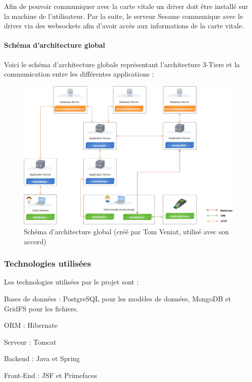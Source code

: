 Afin de pouvoir communiquer avec la carte vitale un driver doit être installé sur la machine de l'utilisateur. Par la suite, le serveur Sesame communique avec le driver via des websockets afin d'avoir accès aux informations de la carte vitale.

\paragraph*{Schéma d'architecture global\\}
Voici le schéma d'architecture globale représentant l'architecture 3-Tiers et la communication entre les différentes applications :
\begin{figure}[H]
  \centering
  \includegraphics[width=18cm]{./img/architecture2}
  \caption{\label{fig:mb_va_ast} Schéma d'architecture global (créé par Tom Veniat, utilisé avec son accord)}
\end{figure}

\subsubsection{Technologies utilisées}
Les technologies utilisées par le projet sont :
\begin{sitemize}
\item Bases de données : PostgreSQL pour les modèles de données, MongoDB et GridFS pour les fichiers.
\item ORM : Hibernate
\item Serveur : Tomcat
\item Backend : Java et Spring
\item Front-End : JSF et Primefaces
\end{sitemize} 

